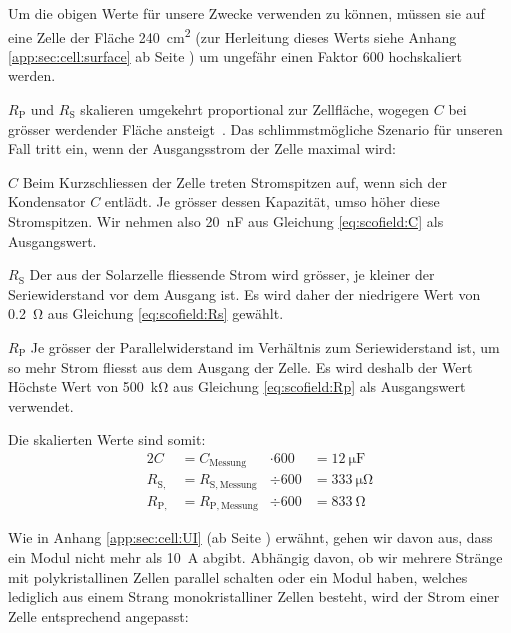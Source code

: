 Um   die   obigen  Werte   f\"ur   unsere   Zwecke  verwenden   zu   k\"onnen,
m\"ussen  sie  auf  eine  Zelle  der  Fl\"ache  \SI{240}{\centi\meter\squared}
(zur  Herleitung  dieses  Werts  siehe  Anhang  \ref{app:sec:cell:surface}  ab
Seite  \pageref{app:sec:cell:surface}) um  ungef\"ahr  einen Faktor  \num{600}
hochskaliert werden.

$R_{\mathrm{P}}$   und  $R_{\mathrm{S}}$   skalieren  umgekehrt   proportional
zur   Zellfl\"ache,    wogegen   $C$   bei   gr\"osser    werdender   Fl\"ache
ansteigt~\cite{ref:solar:scofield}. Das  schlimmstm\"ogliche   Szenario  f\"ur
unseren   Fall  tritt   ein,  wenn   der  Ausgangsstrom   der  Zelle   maximal
wird:

\begin{symbols}
    \firmlist
    \item[$C$]
        Beim Kurzschliessen der  Zelle treten Stromspitzen auf,  wenn sich der
        Kondensator  $C$  entl\"adt. Je  gr\"osser  dessen  Kapazit\"at,  umso
        h\"oher diese Stromspitzen.  Wir  nehmen also \SI{20}{\nano\farad} aus
        Gleichung \ref{eq:scofield:C} als Ausgangswert.
    \item[$R_{\mathrm{S}}$]
        Der aus der Solarzelle fliessende Strom wird gr\"osser, je kleiner der
        Seriewiderstand vor dem Ausgang ist. Es wird daher der niedrigere Wert
        von \SI{0.2}{\ohm} aus Gleichung \ref{eq:scofield:Rs} gew\"ahlt.
    \item[$R_{\mathrm{P}}$]
        Je    gr\"osser   der    Parallelwiderstand   im    Verh\"altnis   zum
        Seriewiderstand   ist,   um   so    mehr   Strom   fliesst   aus   dem
        Ausgang  der  Zelle.    Es  wird  deshalb  der   Wert  H\"ochste  Wert
        von   \SI{500}{\kilo\ohm}  aus   Gleichung  \ref{eq:scofield:Rp}   als
        Ausgangswert verwendet.
\end{symbols}

Die skalierten Werte sind somit:
\begin{alignat}{2}
    C               &= C_{\mathrm{Messung}}    &\cdot 600 &= \SI{12}{\micro\farad} \\
    R_{\mathrm{S,}} &= R_{\mathrm{S, Messung}} &\div  600 &= \SI{333}{\micro\ohm}    \\
    R_{\mathrm{P,}} &= R_{\mathrm{P, Messung}} &\div  600 &= \SI{833}{\ohm}
\end{alignat}

Wie  in  Anhang  \ref{app:sec:cell:UI}  (ab  Seite  \pageref{app:sec:cell:UI})
erw\"ahnt, gehen wir davon aus, dass ein Modul nicht mehr als \SI{10}{\ampere}
abgibt. Abh\"angig davon, ob wir mehrere Str\"ange mit polykristallinen Zellen
parallel schalten  oder ein  Modul haben, welches  lediglich aus  einem Strang
monokristalliner  Zellen  besteht, wird  der  Strom  einer Zelle  entsprechend
angepasst:

